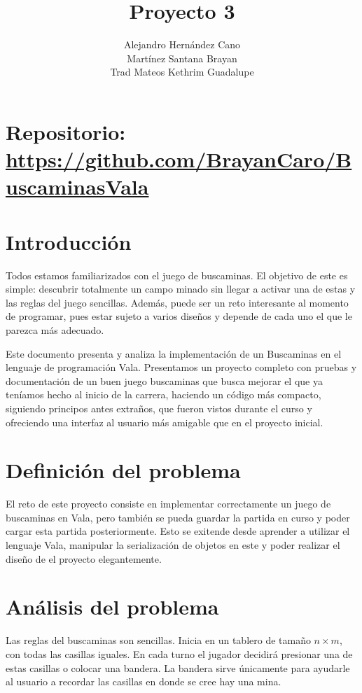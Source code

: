 \documentclass{article}
\title{Proyecto 3}
\author{Alejandro Hernández Cano\\
    Martínez Santana Brayan\\
    Trad Mateos Kethrim Guadalupe}
\begin{document}
    \maketitle
    \section*{Repositorio: \url{https://github.com/BrayanCaro/BuscaminasVala}}

    \section{Introducción}

	Todos estamos familiarizados con el juego de buscaminas. El objetivo de este
	es simple: descubrir totalmente un campo minado sin llegar a activar una de
	estas y las reglas del juego sencillas. Además, puede ser un reto
	interesante al momento de programar, pues estar sujeto a varios diseños y
	depende de cada uno el que le parezca más adecuado.

	Este documento presenta y analiza la implementación de un Buscaminas en el
	lenguaje de programación Vala. Presentamos un proyecto completo con pruebas
	y documentación de un buen juego
	buscaminas que busca mejorar el que ya teníamos hecho al inicio de la
	carrera, haciendo un código más compacto, siguiendo principos antes
	extraños, que fueron vistos durante el curso y ofreciendo una interfaz al
	usuario más amigable que en el proyecto inicial.

	\section{Definición del problema}

	El reto de este proyecto consiste en implementar correctamente un juego de
	buscaminas en Vala, pero también se pueda guardar la partida en curso y
	poder cargar esta partida posteriormente. Esto se exitende desde aprender a
	utilizar el lenguaje Vala, manipular la serialización de objetos en este y
	poder realizar el diseño de el proyecto elegantemente.

	\section{Análisis del problema}

	Las reglas del buscaminas son sencillas. Inicia en un tablero de tamaño $n
	\times m$, con todas las casillas iguales. En cada turno el jugador
	decidirá presionar una de estas casillas o colocar una bandera. La bandera
	sirve únicamente para ayudarle al usuario a recordar las casillas en donde
	se cree hay una mina.
\end{document}
